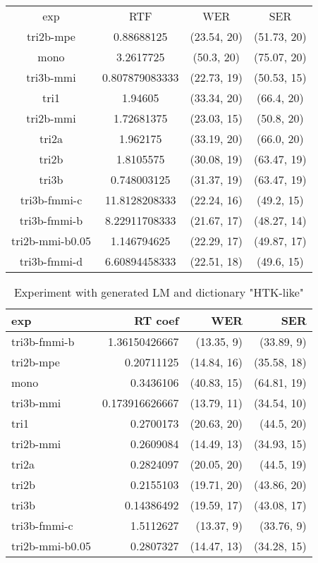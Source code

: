 \begin{table}[!htp]\centering\begin{tabular}{cccc}
exp             & \ac{RTF}       & \ac{WER}         & \ac{SER} \\
tri2b-mpe       & 0.88688125     & (23.54, 20) & (51.73, 20)\\
mono            & 3.2617725      & (50.3, 20)  & (75.07, 20)\\
tri3b-mmi       & 0.807879083333 & (22.73, 19) & (50.53, 15)\\
tri1            & 1.94605        & (33.34, 20) & (66.4, 20) \\
tri2b-mmi       & 1.72681375     & (23.03, 15) & (50.8, 20) \\
tri2a           & 1.962175       & (33.19, 20) & (66.0, 20) \\
tri2b           & 1.8105575      & (30.08, 19) & (63.47, 19)\\
tri3b           & 0.748003125    & (31.37, 19) & (63.47, 19)\\
tri3b-fmmi-c    & 11.8128208333  & (22.24, 16) & (49.2, 15) \\
tri3b-fmmi-b    & 8.22911708333  & (21.67, 17) & (48.27, 14)\\
tri2b-mmi-b0.05 & 1.146794625    & (22.29, 17) & (49.87, 17)\\
tri3b-fmmi-d    & 6.60894458333  & (22.51, 18) & (49.6, 15)
\end{tabular}
\caption{}
\end{table}  


\begin{table}[!htp]\label{tab:htk_like}\centering\begin{tabular}{l|rrr}
exp             & RT coef        & WER         & SER        \\ 
\hline
tri3b-fmmi-b    & 1.36150426667  & (13.35, 9)  & (33.89, 9) \\ 
tri2b-mpe       & 0.20711125     & (14.84, 16) & (35.58, 18)\\ 
mono            & 0.3436106      & (40.83, 15) & (64.81, 19)\\ 
tri3b-mmi       & 0.173916626667 & (13.79, 11) & (34.54, 10)\\ 
tri1            & 0.2700173      & (20.63, 20) & (44.5, 20) \\ 
tri2b-mmi       & 0.2609084      & (14.49, 13) & (34.93, 15)\\ 
tri2a           & 0.2824097      & (20.05, 20) & (44.5, 19) \\ 
tri2b           & 0.2155103      & (19.71, 20) & (43.86, 20)\\ 
tri3b           & 0.14386492     & (19.59, 17) & (43.08, 17)\\ 
tri3b-fmmi-c    & 1.5112627      & (13.37, 9)  & (33.76, 9) \\ 
tri2b-mmi-b0.05 & 0.2807327      & (14.47, 13) & (34.28, 15)\\ 
\end{tabular}
\caption{Experiment with generated LM and dictionary "\ac{HTK}-like"}
\end{table}  

